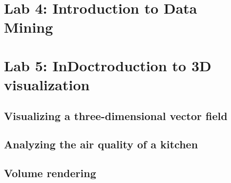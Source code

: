 \documentclass[a4paper]{article}
\begin{document}
\section{Lab 4: Introduction to Data Mining}


\section{Lab 5: InDoctroduction to 3D visualization}

\subsection{Visualizing a three-dimensional vector field}

\subsection{Analyzing the air quality of a kitchen}

\subsection{Volume rendering}
\end{document}
